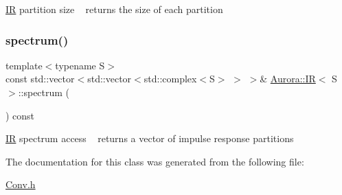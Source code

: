 \hyperlink{class_aurora_1_1_i_r}{IR} partition size ~\newline
returns the size of each partition \mbox{\label{class_aurora_1_1_i_r_a2463850b1167583c7338025b204ed631}} 
\subsubsection{\texorpdfstring{spectrum()}{spectrum()}}
{\footnotesize\ttfamily template$<$typename S$>$ \\
const std\+::vector$<$std\+::vector$<$std\+::complex$<$S$>$ $>$ $>$\& \hyperlink{class_aurora_1_1_i_r}{Aurora\+::\+IR}$<$ S $>$\+::spectrum (\begin{DoxyParamCaption}{ }\end{DoxyParamCaption}) const\hspace{0.3cm}{\ttfamily [inline]}}

\hyperlink{class_aurora_1_1_i_r}{IR} spectrum access ~\newline
returns a vector of impulse response partitions 

The documentation for this class was generated from the following file\+:\begin{DoxyCompactItemize}
\item 
\hyperlink{_conv_8h}{Conv.\+h}\end{DoxyCompactItemize}
